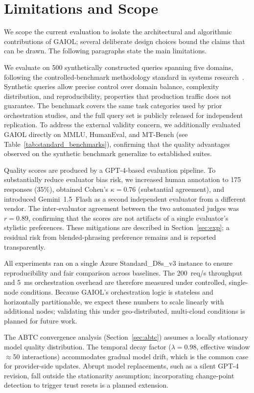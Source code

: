 \documentclass{iopjournal}
\begin{document}
\section{Limitations and Scope}
\label{sec:limitations}

We scope the current evaluation to isolate the architectural and algorithmic contributions of GAIOL; several deliberate design choices bound the claims that can be drawn. The following paragraphs state the main limitations.

We evaluate on 500 synthetically constructed queries spanning five domains, following the controlled-benchmark methodology standard in systems research~\cite{HolisticEval}. Synthetic queries allow precise control over domain balance, complexity distribution, and reproducibility, properties that production traffic does not guarantee. The benchmark covers the same task categories used by prior orchestration studies, and the full query set is publicly released for independent replication. To address the external validity concern, we additionally evaluated GAIOL directly on MMLU, HumanEval, and MT-Bench (see Table~\ref{tab:standard_benchmarks}), confirming that the quality advantages observed on the synthetic benchmark generalize to established suites.

Quality scores are produced by a GPT-4-based evaluation pipeline. To substantially reduce evaluator bias risk, we increased human annotation to 175 responses (35\%), obtained Cohen's $\kappa = 0.76$ (substantial agreement), and introduced Gemini~1.5~Flash as a second independent evaluator from a different vendor. The inter-evaluator agreement between the two automated judges was $r = 0.89$, confirming that the scores are not artifacts of a single evaluator's stylistic preferences. These mitigations are described in Section~\ref{sec:exp}; a residual risk from blended-phrasing preference remains and is reported transparently.

All experiments ran on a single Azure Standard\_D8s\_v3 instance to ensure reproducibility and fair comparison across baselines. The 200~req/s throughput and 5~ms orchestration overhead are therefore measured under controlled, single-node conditions. Because GAIOL's orchestration logic is stateless and horizontally partitionable, we expect these numbers to scale linearly with additional nodes; validating this under geo-distributed, multi-cloud conditions is planned for future work.

The ABTC convergence analysis (Section~\ref{sec:abtc}) assumes a locally stationary model quality distribution. The temporal decay factor ($\lambda = 0.98$, effective window $\approx$50 interactions) accommodates gradual model drift, which is the common case for provider-side updates. Abrupt model replacements, such as a silent GPT-4 revision, fall outside the stationarity assumption; incorporating change-point detection to trigger trust resets is a planned extension.
\end{document}
